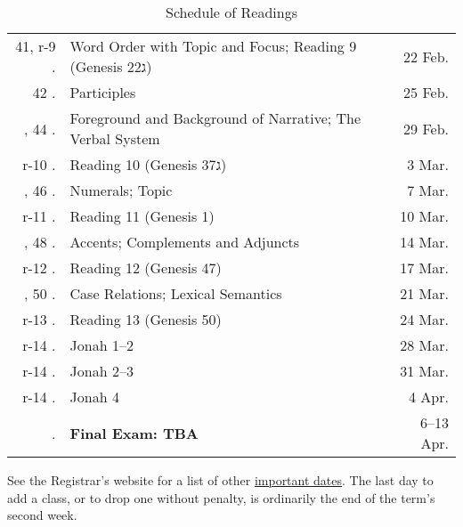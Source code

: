 \documentclass[titlepage]{article}
\begin{document}
\begin{table}[phtb]
\begin{tabular}{@{}r<{.}@{ }lr}
    41, r-9 & Word Order with Topic and Focus; Reading 9 (Genesis 22\texthebrew{ג})\null & 22 Feb.     \\
    42      & Participles                                                                & 25 Feb.     \\ \addlinespace
    43, 44  & Foreground and Background of Narrative; The Verbal System                  & 29 Feb.     \\
    r-10    & Reading 10 (Genesis 37\texthebrew{ג})\null                                 &  3 Mar.     \\ \addlinespace
    45, 46  & Numerals; Topic                                                            &  7 Mar.     \\
    r-11    & Reading 11 (Genesis 1)                                                     & 10 Mar.     \\ \addlinespace
    47, 48  & Accents; Complements and Adjuncts                                          & 14 Mar.     \\
    r-12    & Reading 12 (Genesis 47)                                                    & 17 Mar.     \\ \addlinespace
    49, 50  & Case Relations; Lexical Semantics                                          & 21 Mar.     \\
    r-13    & Reading 13 (Genesis 50)                                                    & 24 Mar.     \\ \addlinespace
    r-14    & Jonah 1--2                                                                 & 28 Mar.     \\
    r-14    & Jonah 2--3                                                                 & 31 Mar.     \\ \addlinespace
    r-14    & Jonah 4                                                                    &  4 Apr.     \\
    \sessionskip{\rarr} & \textbf{Final Exam: TBA}                                       & 6--13 Apr.  \\
    \bottomrule
  \end{tabular}
  \caption{Schedule of Readings}
  \label{schedule}
\end{table}

See the Registrar's website for a list of other
\href{http://www.tyndale.ca/registrar/important-dates}{important dates}.
The last day to add a class, or to drop one without penalty, is
ordinarily the end of the term's second week.
\end{document}

